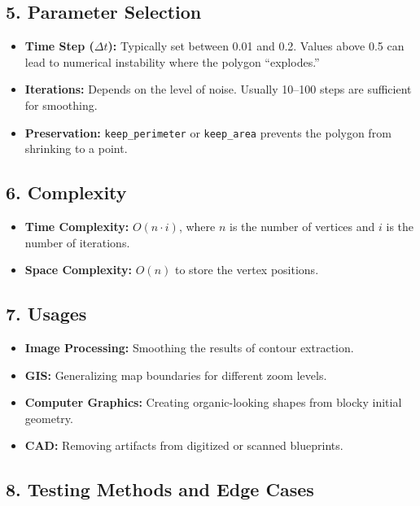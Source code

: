 \subsection{5. Parameter Selection}

\begin{itemize}
    \item \textbf{Time Step ($\Delta t$):} Typically set between 0.01 and 0.2. Values above 0.5 can lead to numerical instability where the polygon ``explodes.''
    \item \textbf{Iterations:} Depends on the level of noise. Usually 10--100 steps are sufficient for smoothing.
    \item \textbf{Preservation:} \texttt{keep\_perimeter} or \texttt{keep\_area} prevents the polygon from shrinking to a point.
\end{itemize}

\subsection{6. Complexity}

\begin{itemize}
    \item \textbf{Time Complexity:} $O(n \cdot i)$, where $n$ is the number of vertices and $i$ is the number of iterations.
    \item \textbf{Space Complexity:} $O(n)$ to store the vertex positions.
\end{itemize}

\subsection{7. Usages}

\begin{itemize}
    \item \textbf{Image Processing:} Smoothing the results of contour extraction.
    \item \textbf{GIS:} Generalizing map boundaries for different zoom levels.
    \item \textbf{Computer Graphics:} Creating organic-looking shapes from blocky initial geometry.
    \item \textbf{CAD:} Removing artifacts from digitized or scanned blueprints.
\end{itemize}

\subsection{8. Testing Methods and Edge Cases}


